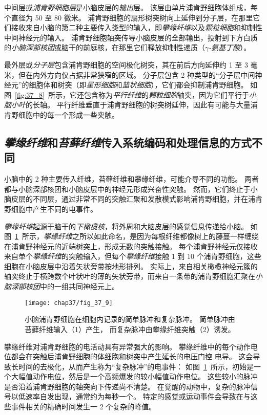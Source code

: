 中间层或\textit{浦肯野细胞层}是小脑皮层的\textit{输出}层。
该层由单片浦肯野细胞体组成，每个直径为 50 至 80 微米。
浦肯野细胞的扇形树突树向上延伸到分子层，在那里它们接收来自小脑的第二种主要传入类型的输入，即\textit{攀缘纤维}以及\textit{颗粒细胞}和抑制性中间神经元的输入。
浦肯野细胞轴突传导小脑皮层的全部输出，投射到下方白质的\textit{小脑深部核团}或脑干的前庭核，在那里它们释放抑制性递质（\textit{$\gamma$-氨基丁酸}）。


最外层或\textit{分子层}包含浦肯野细胞的空间极化树突，其在前后方向延伸约 1 至 3 毫米，但在内外方向仅占据非常狭窄的区域。
分子层包含 2 种类型的“分子层中间神经元”的细胞体和树突（即\textit{星形细胞}和\textit{篮状细胞}），它们都会抑制浦肯野细胞。
如图~\ref{fig:37_8}~所示，它还包含称为\textit{平行纤维}的\textit{颗粒细胞}轴突，因为它们平行于\textit{小脑小叶}的长轴。
平行纤维垂直于浦肯野细胞的树突树延伸，因此有可能与大量浦肯野细胞中的每一个形成一些突触。


\subsection{\textit{攀缘纤维}和\textit{苔藓纤维}传入系统编码和处理信息的方式不同}

小脑中的 2 种主要传入纤维，苔藓纤维和攀缘纤维，可能介导不同的功能。
两者都与小脑深部核团和小脑皮层中的神经元形成兴奋性突触。
然而，它们终止于小脑皮层的不同层，通过非常不同的突触汇聚和发散模式影响浦肯野细胞，并在浦肯野细胞中产生不同的电事件。


\textit{攀缘纤维}起源于脑干的\textit{下橄榄核}，将外周和大脑皮层的感觉信息传递给小脑。
如图~\ref{fig:37_9}~所示，\textit{攀缘纤维}之所以如此命名，是因为每根纤维都像树上的藤蔓一样缠绕在浦肯野神经元的近端树突上，形成无数的突触接触。
每个浦肯野神经元仅接收来自单个\textit{攀缘纤维}的突触输入，但每个\textit{攀缘纤维}接触 1 到 10 个浦肯野细胞，这些细胞在小脑皮层中沿着矢状旁带按地形排列。
实际上，来自相关橄榄神经元簇的轴突终止于横跨数个叶状叶的薄的矢状旁带，而来自一条带的浦肯野细胞汇聚在\textit{小脑深部核团}中的一组共同神经元上。


\begin{figure}[htbp]
	\centering
	\texttt{[image: chap37/fig\_37\_9]}
	\caption{小脑浦肯野细胞在细胞内记录的简单脉冲和复杂脉冲。
		简单脉冲由苔藓纤维输入（1）产生，
		而复杂脉冲由攀缘纤维突触（2）诱发\cite{martinez1971electrogenesis}。}
	\label{fig:37_9}
\end{figure}


攀缘纤维对浦肯野细胞的电活动具有异常强大的影响。
攀缘纤维中的每个动作电位都会在突触后浦肯野细胞的体细胞和树突中产生延长的电压门控  电导。
这会导致长时间的去极化，从而产生称为“复杂脉冲”的电事件：
如图~\ref{fig:37_9}~所示，初始是一个大幅值动作电位，然后是一个高频爆发的较小幅值动作电位。
这些较小的脉冲是否沿着浦肯野细胞的轴突向下传递尚不清楚。
在觉醒的动物中，复杂的脉冲信号以低速率自发出现，通常约为每秒一个。
特定的感觉或运动事件会导致在与这些事件相关的精确时间发生一 2 个复杂的峰值。


